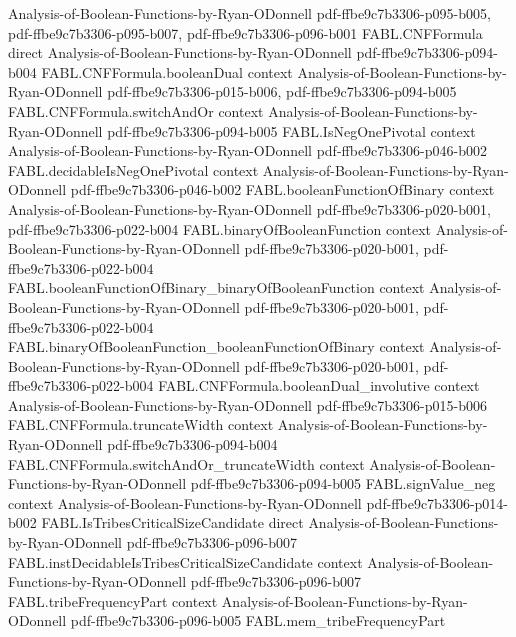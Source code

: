 \begin{theorem}
  {Analysis-of-Boolean-Functions-by-Ryan-ODonnell}
  {pdf-ffbe9c7b3306-p095-b005,
    pdf-ffbe9c7b3306-p095-b007,
    pdf-ffbe9c7b3306-p096-b001}
\proofstep
  {FABL.CNFFormula}
  {direct}
  {Analysis-of-Boolean-Functions-by-Ryan-ODonnell}
  {pdf-ffbe9c7b3306-p094-b004}
\proofstep
  {FABL.CNFFormula.booleanDual}
  {context}
  {Analysis-of-Boolean-Functions-by-Ryan-ODonnell}
  {pdf-ffbe9c7b3306-p015-b006,
    pdf-ffbe9c7b3306-p094-b005}
\proofstep
  {FABL.CNFFormula.switchAndOr}
  {context}
  {Analysis-of-Boolean-Functions-by-Ryan-ODonnell}
  {pdf-ffbe9c7b3306-p094-b005}
\proofstep
  {FABL.IsNegOnePivotal}
  {context}
  {Analysis-of-Boolean-Functions-by-Ryan-ODonnell}
  {pdf-ffbe9c7b3306-p046-b002}
\proofstep
  {FABL.decidableIsNegOnePivotal}
  {context}
  {Analysis-of-Boolean-Functions-by-Ryan-ODonnell}
  {pdf-ffbe9c7b3306-p046-b002}
\proofstep
  {FABL.booleanFunctionOfBinary}
  {context}
  {Analysis-of-Boolean-Functions-by-Ryan-ODonnell}
  {pdf-ffbe9c7b3306-p020-b001,
    pdf-ffbe9c7b3306-p022-b004}
\proofstep
  {FABL.binaryOfBooleanFunction}
  {context}
  {Analysis-of-Boolean-Functions-by-Ryan-ODonnell}
  {pdf-ffbe9c7b3306-p020-b001,
    pdf-ffbe9c7b3306-p022-b004}
\proofstep
  {FABL.booleanFunctionOfBinary_binaryOfBooleanFunction}
  {context}
  {Analysis-of-Boolean-Functions-by-Ryan-ODonnell}
  {pdf-ffbe9c7b3306-p020-b001,
    pdf-ffbe9c7b3306-p022-b004}
\proofstep
  {FABL.binaryOfBooleanFunction_booleanFunctionOfBinary}
  {context}
  {Analysis-of-Boolean-Functions-by-Ryan-ODonnell}
  {pdf-ffbe9c7b3306-p020-b001,
    pdf-ffbe9c7b3306-p022-b004}
\proofstep
  {FABL.CNFFormula.booleanDual_involutive}
  {context}
  {Analysis-of-Boolean-Functions-by-Ryan-ODonnell}
  {pdf-ffbe9c7b3306-p015-b006}
\proofstep
  {FABL.CNFFormula.truncateWidth}
  {context}
  {Analysis-of-Boolean-Functions-by-Ryan-ODonnell}
  {pdf-ffbe9c7b3306-p094-b004}
\proofstep
  {FABL.CNFFormula.switchAndOr_truncateWidth}
  {context}
  {Analysis-of-Boolean-Functions-by-Ryan-ODonnell}
  {pdf-ffbe9c7b3306-p094-b005}
\proofstep
  {FABL.signValue_neg}
  {context}
  {Analysis-of-Boolean-Functions-by-Ryan-ODonnell}
  {pdf-ffbe9c7b3306-p014-b002}
\proofstep
  {FABL.IsTribesCriticalSizeCandidate}
  {direct}
  {Analysis-of-Boolean-Functions-by-Ryan-ODonnell}
  {pdf-ffbe9c7b3306-p096-b007}
\proofstep
  {FABL.instDecidableIsTribesCriticalSizeCandidate}
  {context}
  {Analysis-of-Boolean-Functions-by-Ryan-ODonnell}
  {pdf-ffbe9c7b3306-p096-b007}
\proofstep
  {FABL.tribeFrequencyPart}
  {context}
  {Analysis-of-Boolean-Functions-by-Ryan-ODonnell}
  {pdf-ffbe9c7b3306-p096-b005}
\proofstep
  {FABL.mem_tribeFrequencyPart}

\end{theorem}
